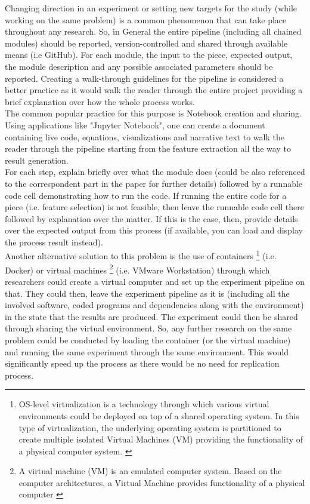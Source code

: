     Changing direction in an experiment or setting new targets for the study (while working on the same problem) is a common phenomenon that 
    can take place throughout any research. So, in General the entire pipeline (including all chained modules) should be reported, 
    version-controlled and shared through available means (i.e GitHub). For each module, the input to the piece, expected output, 
    the module description and any possible associated parameters should be reported. 
    Creating a walk-through guidelines for the pipeline is considered a better practice as it would walk the reader through the entire project 
    providing a brief explanation over how the whole process works.\\
    
    The common popular practice for this purpose is Notebook creation and sharing. Using applications like "Jupyter Notebook", one can create a 
    document containing live code, equations, visualizations and narrative text to walk the reader through the pipeline starting from 
    the feature extraction all the way to result generation.\\
    
    For each step, explain briefly over what the module does (could be also referenced to the correspondent part in the paper for further details) 
    followed by a runnable code cell demonstrating how to run the code. 
    If running the entire code for a piece (i.e. feature selection) is not feasible, then leave the runnable code cell there followed by 
    explanation over the matter. If this is the case, then, provide details over the expected output from this process 
    (if available, you can load and display the process result instead).\\
    
    Another alternative solution to this problem is the use of containers \footnote{OS-level virtualization is a technology through which various virtual 
    environments could be deployed on top of a shared operating system. In this type of virtualization, the underlying operating system is partitioned
    to create multiple isolated Virtual Machines (VM) providing the functionality of a physical computer system. \cite{osLevelVM}} (i.e. Docker) 
    or virtual machines \footnote{A virtual machine (VM) is an emulated computer system. Based on the computer architectures, 
    a Virtual Machine provides functionality of a physical computer \cite{virtualizationOverview}} (i.e. VMware Workstation) 
    through which researchers could create  
    a virtual computer and set up the experiment pipeline on that. They could then, leave the experiment 
    pipeline as it is (including all the involved software, coded programs and dependencies along with the environment) 
    in the state that the results are produced. 
    The experiment could then be shared through sharing the virtual environment. So, any 
    further research on the same problem could be conducted by loading the container (or the virtual machine) and running 
    the same experiment through the same environment. This would significantly speed up the process as there would be no need for  
    replication process.



